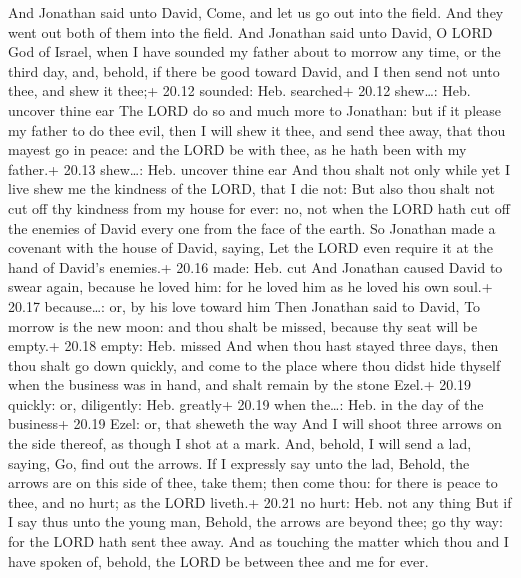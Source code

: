  And Jonathan said unto David, Come, and let us go out
into the field. And they went out both of them into the field.
 And Jonathan said unto David, O LORD God of Israel, when I
have sounded my father about to morrow any time, or the third day, and,
behold, if there be good toward David, and I then send not unto thee,
and shew it thee;+ 20.12 sounded: Heb. searched+ 20.12 shew\ldots: Heb.
uncover thine ear  The LORD do so and much more to
Jonathan: but if it please my father to do thee evil, then I will shew
it thee, and send thee away, that thou mayest go in peace: and the LORD
be with thee, as he hath been with my father.+ 20.13 shew\ldots: Heb.
uncover thine ear  And thou shalt not only while yet I live
shew me the kindness of the LORD, that I die not:  But also
thou shalt not cut off thy kindness from my house for ever: no, not when
the LORD hath cut off the enemies of David every one from the face of
the earth.  So Jonathan made a covenant with the house of
David, saying, Let the LORD even require it at the hand of David's
enemies.+ 20.16 made: Heb. cut  And Jonathan caused David
to swear again, because he loved him: for he loved him as he loved his
own soul.+ 20.17 because\ldots: or, by his love toward him 
Then Jonathan said to David, To morrow is the new moon: and thou shalt
be missed, because thy seat will be empty.+ 20.18 empty: Heb. missed
 And when thou hast stayed three days, then thou shalt go
down quickly, and come to the place where thou didst hide thyself when
the business was in hand, and shalt remain by the stone Ezel.+ 20.19
quickly: or, diligently: Heb. greatly+ 20.19 when the\ldots: Heb. in the
day of the business+ 20.19 Ezel: or, that sheweth the way 
And I will shoot three arrows on the side thereof, as though I shot at a
mark.  And, behold, I will send a lad, saying, Go, find out
the arrows. If I expressly say unto the lad, Behold, the arrows are on
this side of thee, take them; then come thou: for there is peace to
thee, and no hurt; as the LORD liveth.+ 20.21 no hurt: Heb. not any
thing  But if I say thus unto the young man, Behold, the
arrows are beyond thee; go thy way: for the LORD hath sent thee away.
 And as touching the matter which thou and I have spoken
of, behold, the LORD be between thee and me for ever.

